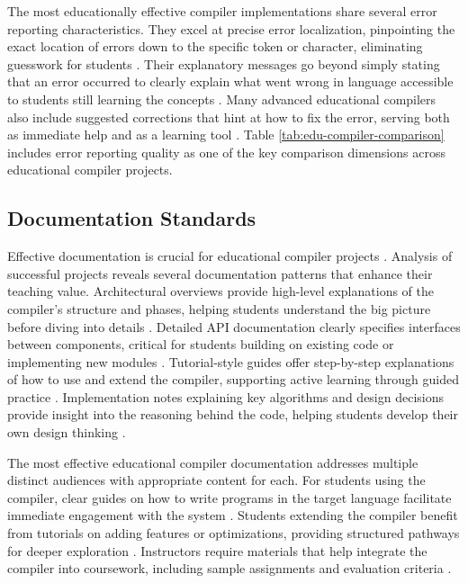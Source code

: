 The most educationally effective compiler implementations share several error reporting characteristics. They excel at precise error localization, pinpointing the exact location of errors down to the specific token or character, eliminating guesswork for students \cite{horwitz2007student}. Their explanatory messages go beyond simply stating that an error occurred to clearly explain what went wrong in language accessible to students still learning the concepts \cite{traver2010compiler}. Many advanced educational compilers also include suggested corrections that hint at how to fix the error, serving both as immediate help and as a learning tool \cite{traver2010compiler}. Table \ref{tab:edu-compiler-comparison} includes error reporting quality as one of the key comparison dimensions across educational compiler projects.

\subsection{Documentation Standards}

Effective documentation is crucial for educational compiler projects \cite{forward2002relevance}. Analysis of successful projects reveals several documentation patterns that enhance their teaching value. Architectural overviews provide high-level explanations of the compiler's structure and phases, helping students understand the big picture before diving into details \cite{forward2002relevance}. Detailed API documentation clearly specifies interfaces between components, critical for students building on existing code or implementing new modules \cite{forward2002relevance}. Tutorial-style guides offer step-by-step explanations of how to use and extend the compiler, supporting active learning through guided practice \cite{patel2021comparing}. Implementation notes explaining key algorithms and design decisions provide insight into the reasoning behind the code, helping students develop their own design thinking \cite{appel1998modern}.

The most effective educational compiler documentation addresses multiple distinct audiences with appropriate content for each. For students using the compiler, clear guides on how to write programs in the target language facilitate immediate engagement with the system \cite{forward2002relevance}. Students extending the compiler benefit from tutorials on adding features or optimizations, providing structured pathways for deeper exploration \cite{patel2021comparing}. Instructors require materials that help integrate the compiler into coursework, including sample assignments and evaluation criteria \cite{forward2002relevance}.

